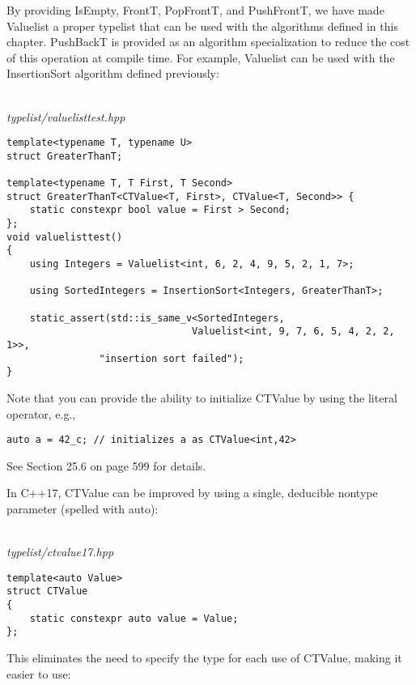 By providing IsEmpty, FrontT, PopFrontT, and PushFrontT, we have made Valuelist a proper typelist that can be used with the algorithms defined in this chapter. PushBackT is provided as an algorithm specialization to reduce the cost of this operation at compile time. For example, Valuelist can be used with the InsertionSort algorithm defined previously:

\hspace*{\fill} \\ %
\noindent
\textit{typelist/valuelisttest.hpp}
\begin{lstlisting}[style=styleCXX]
template<typename T, typename U>
struct GreaterThanT;

template<typename T, T First, T Second>
struct GreaterThanT<CTValue<T, First>, CTValue<T, Second>> {
	static constexpr bool value = First > Second;
};
void valuelisttest()
{
	using Integers = Valuelist<int, 6, 2, 4, 9, 5, 2, 1, 7>;
	
	using SortedIntegers = InsertionSort<Integers, GreaterThanT>;
	
	static_assert(std::is_same_v<SortedIntegers,
								Valuelist<int, 9, 7, 6, 5, 4, 2, 2, 1>>,
				"insertion sort failed");
}
\end{lstlisting}

Note that you can provide the ability to initialize CTValue by using the literal operator, e.g.,

\begin{lstlisting}[style=styleCXX]
auto a = 42_c; // initializes a as CTValue<int,42>
\end{lstlisting}

See Section 25.6 on page 599 for details.


In C++17, CTValue can be improved by using a single, deducible nontype parameter (spelled with auto):

\hspace*{\fill} \\ %
\noindent
\textit{typelist/ctvalue17.hpp}
\begin{lstlisting}[style=styleCXX]
template<auto Value>
struct CTValue
{
	static constexpr auto value = Value;
};
\end{lstlisting}

This eliminates the need to specify the type for each use of CTValue, making it easier to use:

